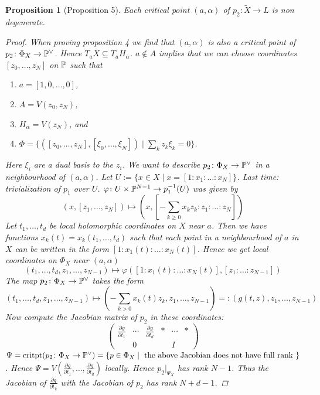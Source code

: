 \documentclass[A4paper, british]{amsart}
\theoremstyle{darkgreentheorem}
\newtheorem{prop}[thm]{Proposition}
\theoremstyle{darkbluedefinition}
\theoremstyle{darkredexample}
\theoremstyle{remark}
\newcommand{\1}{\mathbbm{1}}
\newcommand{\dual}{^{\vee}}
\newcommand{\sub}{\subseteq}
\begin{document}
\begin{prop}[Proposition 5]
    Each critical point $(a,\alpha)$ of $p_{2}\colon \tilde{X}\to L$ is non degenerate.
    \begin{proof}
	When proving proposition 4 we find that $(a,\alpha)$ is also a critical point of $p_{2}\colon \Phi_{X}\to \P\dual$.
	Hence $T_{a}X\sub T_{a}H_{\alpha}$.
	$a\not\in A$ implies that we can choose coordinates $[z_{0},\ldots,z_{N}]$ on $\P$ such that
	\begin{enumerate}
	    \item $a=[1,0,\ldots,0]$,
	    \item $A=V(z_{0},z_{N})$,
	    \item $H_{\alpha}=V(z_{N})$, and
	    \item $\Phi=\{ ([z_{0},\ldots,z_{N}],[\xi_{0},\ldots,\xi_{N}])\mid \sum_{k}z_{k}\xi_{k}=0\}$.
	\end{enumerate}
	Here $\xi_{i}$ are a dual basis to the $z_{i}$.
	We want to describe $p_{2}\colon \Phi_{X}\to \P\dual$ in a neighbourhood of $(a,\alpha)$.
	Let $U:=\{x\in X\mid x=[1:x_{1}:\ldots:x_{N}]\}$.
	Last time: trivialization of $p_{1}$ over $U$.
	$\varphi\colon U\times \P^{N-1}\to p_{1}^{-1}(U)$ was given by
	\[ (x,[z_{1},\ldots,z_{N}])\mapsto (x,[-\sum_{k\geqslant 0}x_{k}z_{k}:z_{1}:\ldots:z_{N}]) \]
	Let $t_{1},\ldots,t_{d}$ be local holomorphic coordinates on $X$ near $a$.
	Then we have functions $x_{k}(t)=x_{k}(t_{1},\ldots,t_{d})$ such that each point in a neighbourhood of $a$ in $X$ can be written in the form $[1:x_{1}(t):\ldots:x_{N}(t)]$.
	Hence we get local coordinates on $\Phi_{X}$ near $(a,\alpha)$
	\[ (t_{1},\ldots,t_{d},z_{1},\ldots,z_{N-1})\mapsto \varphi([1:x_{1}(t):\ldots:x_{N}(t)],[z_{1}:\ldots:z_{N-1}]) \]
	The map $p_{2}\colon \Phi_{X}\to \P\dual$ takes the form
	\[ (t_{1},\ldots,t_{d},z_{1},\ldots,z_{N-1})\mapsto (-\sum_{k>0} x_{k}(t)z_{k},z_{1},\ldots,z_{N-1})=:(g(t,z),z_{1},\ldots,z_{N-1}) \]
	Now compute the Jacobian matrix of $p_{2}$ in these coordinates:
	\[ \begin{pmatrix} \frac{\partial g}{\partial t_{1}} & \cdots & \frac{\partial g}{\partial t_{d}} & * & \cdots & * \\ & 0 & & & I & \end{pmatrix} \]
	$\Psi=\operatorname{critpt}(p_{2}\colon \Phi_{X}\to \P\dual)=\{ p\in \Phi_{X}\mid \text{ the above Jacobian does not have full rank }\}$.
	Hence $\Psi=V(\frac{\partial g}{\partial t_{1}},\ldots,\frac{\partial g}{\partial t_{d}})$ locally.
	Hence $p_{2}|_{\Psi_{X}}$ has rank $N-1$.
	Thus the Jacobian of $\frac{\partial g}{\partial t_{k}}$ with the Jacobian of $p_{2}$ has rank $N+d-1$.

\end{proof}
\end{prop}
\end{document}
